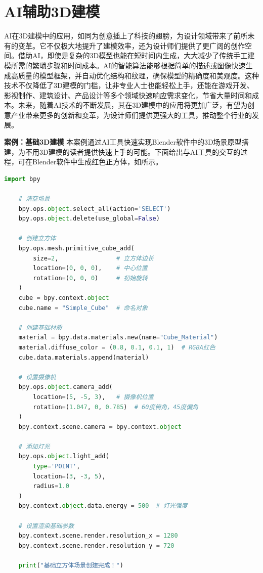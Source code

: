 \section{AI辅助3D建模}


AI在3D建模中的应用，如同为创意插上了科技的翅膀，为设计领域带来了前所未有的变革。它不仅极大地提升了建模效率，还为设计师们提供了更广阔的创作空间。借助AI，即使是复杂的3D模型也能在短时间内生成，大大减少了传统手工建模所需的繁琐步骤和时间成本。AI的智能算法能够根据简单的描述或图像快速生成高质量的模型框架，并自动优化结构和纹理，确保模型的精确度和美观度。这种技术不仅降低了3D建模的门槛，让非专业人士也能轻松上手，还能在游戏开发、影视制作、建筑设计、产品设计等多个领域快速响应需求变化，节省大量时间和成本。未来，随着AI技术的不断发展，其在3D建模中的应用将更加广泛，有望为创意产业带来更多的创新和变革，为设计师们提供更强大的工具，推动整个行业的发展。


\textbf{案例：基础3D建模}
本案例通过AI工具快速实现Blender软件中的3D场景原型搭建，为不用3D建模的读者提供快速上手的可能。下面给出与AI工具的交互的过程，可在Blender软件中生成红色正方体，如所示。



\begin{gptbox} 
\small{ 
\begin{lstlisting}[language=Python] 
    import bpy
    
    # 清空场景
    bpy.ops.object.select_all(action='SELECT')
    bpy.ops.object.delete(use_global=False)
    
    # 创建立方体
    bpy.ops.mesh.primitive_cube_add(
        size=2,                # 立方体边长
        location=(0, 0, 0),    # 中心位置
        rotation=(0, 0, 0)     # 初始旋转
    )
    cube = bpy.context.object
    cube.name = "Simple_Cube"  # 命名对象
    
    # 创建基础材质
    material = bpy.data.materials.new(name="Cube_Material")
    material.diffuse_color = (0.8, 0.1, 0.1, 1)  # RGBA红色
    cube.data.materials.append(material)
    
    # 设置摄像机
    bpy.ops.object.camera_add(
        location=(5, -5, 3),   # 摄像机位置
        rotation=(1.047, 0, 0.785)  # 60度俯角，45度偏角
    )
    bpy.context.scene.camera = bpy.context.object
    
    # 添加灯光
    bpy.ops.object.light_add(
        type='POINT',
        location=(3, -3, 5),
        radius=1.0
    )
    bpy.context.object.data.energy = 500  # 灯光强度
    
    # 设置渲染基础参数
    bpy.context.scene.render.resolution_x = 1280
    bpy.context.scene.render.resolution_y = 720
    
    print("基础立方体场景创建完成！")

\end{lstlisting}
} 
\end{gptbox}

